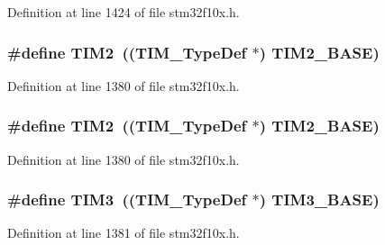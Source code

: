 Definition at line 1424 of file stm32f10x.\+h.

\subsubsection[{\texorpdfstring{T\+I\+M2}{TIM2}}]{\setlength{\rightskip}{0pt plus 5cm}\#define T\+I\+M2~(({\bf T\+I\+M\+\_\+\+Type\+Def} $\ast$) {\bf T\+I\+M2\+\_\+\+B\+A\+SE})}\hypertarget{group___peripheral__declaration_ga3cfac9f2e43673f790f8668d48b4b92b}{}\label{group___peripheral__declaration_ga3cfac9f2e43673f790f8668d48b4b92b}


Definition at line 1380 of file stm32f10x.\+h.

\subsubsection[{\texorpdfstring{T\+I\+M2}{TIM2}}]{\setlength{\rightskip}{0pt plus 5cm}\#define T\+I\+M2~(({\bf T\+I\+M\+\_\+\+Type\+Def} $\ast$) {\bf T\+I\+M2\+\_\+\+B\+A\+SE})}\hypertarget{group___peripheral__declaration_ga3cfac9f2e43673f790f8668d48b4b92b}{}\label{group___peripheral__declaration_ga3cfac9f2e43673f790f8668d48b4b92b}


Definition at line 1380 of file stm32f10x.\+h.

\subsubsection[{\texorpdfstring{T\+I\+M3}{TIM3}}]{\setlength{\rightskip}{0pt plus 5cm}\#define T\+I\+M3~(({\bf T\+I\+M\+\_\+\+Type\+Def} $\ast$) {\bf T\+I\+M3\+\_\+\+B\+A\+SE})}\hypertarget{group___peripheral__declaration_ga61ee4c391385607d7af432b63905fcc9}{}\label{group___peripheral__declaration_ga61ee4c391385607d7af432b63905fcc9}


Definition at line 1381 of file stm32f10x.\+h.

